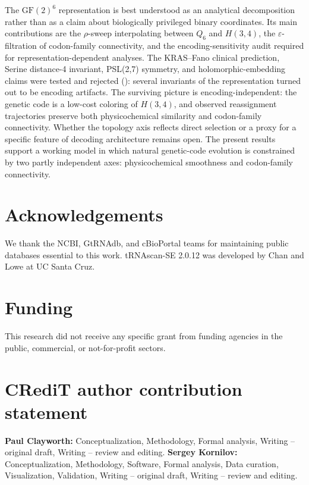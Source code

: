 \documentclass[preprint,11pt,authoryear,a4paper]{elsarticle}
\begin{document}
The \({\text{GF}(2)}^{6}\) representation is best understood as an
analytical decomposition rather than as a claim about biologically
privileged binary coordinates. Its main contributions are the
\(\rho\)-sweep interpolating between \(Q_{6}\) and \(H(3,4)\), the
\(\varepsilon\)-filtration of codon-family connectivity, and the
encoding-sensitivity audit required for representation-dependent
analyses. The KRAS--Fano clinical prediction, Serine distance-4
invariant, PSL(2,7) symmetry, and holomorphic-embedding claims were
tested and rejected (): several invariants of the
representation turned out to be encoding artifacts. The surviving
picture is encoding-independent: the genetic code is a low-cost coloring
of \(H(3,4)\), and observed reassignment trajectories preserve both
physicochemical similarity and codon-family connectivity. Whether the
topology axis reflects direct selection or a proxy for a specific
feature of decoding architecture remains open. The present results
support a working model in which natural genetic-code evolution is
constrained by two partly independent axes: physicochemical smoothness
and codon-family connectivity.

\section{Acknowledgements}

We thank the NCBI, GtRNAdb, and cBioPortal teams for maintaining public
databases essential to this work. tRNAscan-SE 2.0.12 was developed by
Chan and Lowe at UC Santa Cruz.

\section{Funding}

This research did not receive any specific grant from funding agencies
in the public, commercial, or not-for-profit sectors.

\section{CRediT author contribution statement}

\textbf{Paul Clayworth:} Conceptualization, Methodology, Formal
analysis, Writing -- original draft, Writing -- review and editing.
\textbf{Sergey Kornilov:} Conceptualization, Methodology, Software,
Formal analysis, Data curation, Visualization, Validation, Writing --
original draft, Writing -- review and editing.
\end{document}
